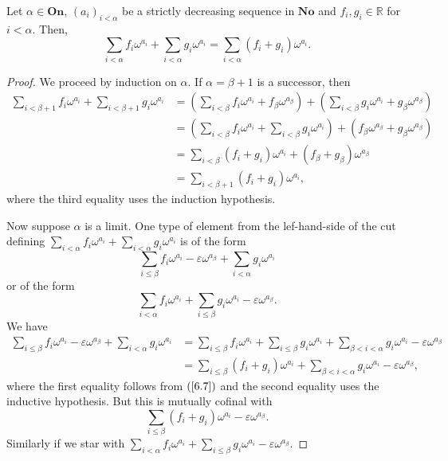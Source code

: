 \begin{proposition}  Let $\alpha \in \textbf{On}$, $(a_i)_{i<\alpha}$ be a strictly decreasing sequence in $\textbf{No}$ and $f_i, g_i\in \mathds{R}$ for $i<\alpha$. Then, 
$$\sum_{i<\alpha}f_i\omega^{a_i} + \sum_{i<\alpha} g_i \omega^{a_i} = \sum_{i<\alpha}(f_i+g_i)\omega^{a_i}.$$
\end{proposition}

\begin{proof} We proceed by induction on $\alpha$.  If $\alpha=\beta+1$ is a successor, then
\begin{align*} \sum_{i<\beta+1}f_i\omega^{a_i} + \sum_{i<\beta+1} g_i \omega^{a_i} & = \left ( \sum_{i<\beta} f_i\omega^{a_i} + f_\beta \omega^{a_\beta} \right ) + \left (  \sum_{i<\beta} g_i \omega^{a_i} + g_\beta \omega^{a_\beta} \right ) \\
	& = \left ( \sum_{i<\beta} f_i\omega^{a_i} + \sum_{i<\beta} g_i \omega^{a_i} \right ) + ( f_\beta \omega^{a_\beta} + g_\beta \omega^{a_\beta}) \\
	& = \sum_{i<\beta} (f_i+g_i) \omega^{a_i} + (f_\beta+g_\beta)\omega^{a_\beta} \\
	& = \sum_{i<\beta+1}(f_i+g_i)\omega^{a_i}, \end{align*}
where the third equality uses the induction hypothesis.

Now suppose $\alpha$ is a limit.  One type of element from the lef-hand-side of the cut defining   $\sum_{i<\alpha}f_i\omega^{a_i} + \sum_{i<\alpha} g_i \omega^{a_i}$ is of the form
$$\sum_{i\leq \beta} f_i \omega^{a_i}-\varepsilon  \omega^{a_\beta} +\sum_{i<\alpha} g_i \omega^{a_i}$$
or of the form
$$\sum_{i<\alpha} f_i \omega^{a_i} +\sum_{i\leq \beta} g_i \omega^{a_i} -\varepsilon  \omega^{a_\beta}.$$
We have
\begin{align*} \sum_{i\leq \beta} f_i \omega^{a_i}-\varepsilon  \omega^{a_\beta} +\sum_{i<\alpha} g_i \omega^{a_i} 
 & = \sum_{i\leq \beta} f_i \omega^{a_i} + \sum_{i\leq \beta} g_i \omega^{a_i} + \sum_{\beta< i<\alpha} g_i \omega^{a_i} -\varepsilon  \omega^{a_\beta} \\
  & = \sum_{i\leq \beta}(f_i+g_i)\omega^{a_i} + \sum_{\beta< i<\alpha} g_i \omega^{a_i} -\varepsilon  \omega^{a_\beta}, \end{align*}
  where the first equality follows from $(\ref{6.7})$ and the second equality uses the inductive hypothesis.  But this is mutually cofinal with 
 $$\sum_{i\leq \beta}(f_i+g_i)\omega^{a_i} - \varepsilon \omega^{a_\beta}.$$
 Similarly if we star with $\sum_{i<\alpha} f_i \omega^{a_i} +\sum_{i\leq \beta} g_i \omega^{a_i} -\varepsilon  \omega^{a_\beta}.$
\end{proof}


